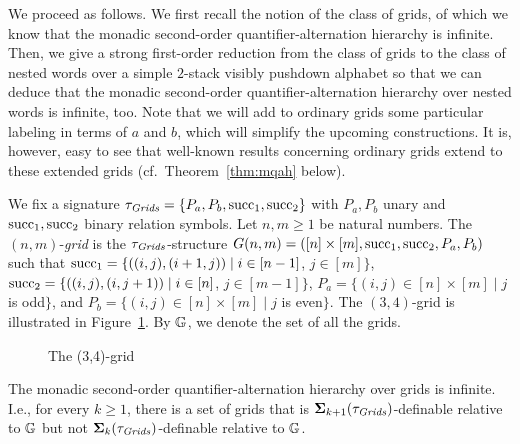 \documentclass{LMCS}
\begin{document}
We proceed as follows. We first recall the notion of the class of grids, of
which we know that the monadic second-order quantifier-alternation hierarchy
is infinite. Then, we give a strong first-order reduction from the class of
grids to the class of nested words over a simple $2$-stack visibly pushdown
alphabet so that we can deduce that the monadic second-order
quantifier-alternation hierarchy over nested words is infinite, too. Note that
we will add to ordinary grids some particular labeling in terms of $a$ and
$b$, which will simplify the upcoming constructions. It is, however, easy to
see that well-known results concerning ordinary grids extend to these extended
grids (cf.\ Theorem~\ref{thm:mqah} below).

We fix a signature $\tau_{\mathit{Grids}}=\{P_a,P_b,\mathord{\mathrm{succ}_1},\mathord{\mathrm{succ}_2}\}$ with $P_a,P_b$ unary
and $\mathord{\mathrm{succ}_1},\mathord{\mathrm{succ}_2}$ binary relation symbols. Let $n,m \ge 1$ be natural
numbers. The $(n,m)$-\emph{grid} is the $\tau_{\mathit{Grids}}$-structure $G(n,m) = ([n]
\times [m],\mathord{\mathrm{succ}_1},\mathord{\mathrm{succ}_2},P_a,P_b)$ such that $\mathord{\mathrm{succ}_1} = \{((i,j),(i+1,j)) \mid
i \in [n-1]$, $j \in [m]\}$, $\mathord{\mathrm{succ}_2} = \{((i,j),(i,j+1)) \mid i \in [n]$, $j
\in [m-1]\}$, $P_a = \{(i,j) \in [n] \times [m] \mid j$ is odd$\}$, and $P_b =
\{(i,j) \in [n] \times [m] \mid j$ is even$\}$. The $(3,4)$-grid is
illustrated in Figure~\ref{fig:examplegrid}. By $\mathbb{G}$, we denote the set of
all the grids.

\begin{figure}[h]
\begin{center}
\caption{The (3,4)-grid\label{fig:examplegrid}}
\end{center}
\end{figure}

\begin{thm}\label{thm:mqah} The monadic second-order
  quantifier-alternation hierarchy over grids is infinite. I.e., for every $k
  \ge 1$, there is a set of grids that is ${\bf{\Sigma}}_{k+1}(\tau_{\mathit{Grids}})$-definable
  relative to $\mathbb{G}$ but not ${\bf{\Sigma}}_{k}(\tau_{\mathit{Grids}})$-definable relative to
  $\mathbb{G}$.
\end{thm}
\end{document}
